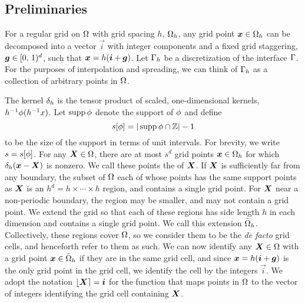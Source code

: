 \subsection{Preliminaries}

For a regular grid on $\Omega$ with grid spacing $h$, $\Omega_h$, any grid point
$\boldsymbol{x}\in\Omega_h$ can be decomposed into a vector $\vec{i}$ with integer components and a
fixed grid staggering, $\boldsymbol{g}\in[0,\,1)^d$, such that $\boldsymbol{x}=h(\boldsymbol{i}+\boldsymbol{g})$. Let
$\Gamma_h$ be a discretization of the interface $\Gamma$. For the purposes of
interpolation and spreading, we can think of $\Gamma_h$ as a collection of arbitrary
points in $\Omega$.



The kernel $\delta_h$ is the tensor product of scaled, one-dimensional kernels,
$h^{-1}\phi(h^{-1}x)$. Let $\operatorname{supp}\phi$ denote the support of $\phi$ and define
\begin{equation}
    s[\phi] = |\operatorname{supp}\phi\cap\mathbb{Z}|-1
\end{equation}
to be the size of the support in terms of unit intervals. For brevity, we write
$s=s[\phi]$. For any $\boldsymbol{X}\in\Omega$, there are at most $s^d$ grid points
$\boldsymbol{x}\in\Omega_h$ for which $\delta_h(\boldsymbol{x}-\boldsymbol{X})$ is nonzero. We call these points the
 of $\boldsymbol{X}$. If $\boldsymbol{X}$ is sufficiently far from any boundary, the subset
of $\Omega$ each of whose points has the same support points as $\boldsymbol{X}$ is an
$h^d=h\times\cdots\times h$ region, and contains a single grid point. For $\boldsymbol{X}$ near a
non-periodic boundary, the region may be smaller, and may not contain a grid point. We
extend the grid so that each of these regions has side length $h$ in each dimension and
contains a single grid point.  We call this extension $\bar{\Omega}_h$. Collectively,
these regions cover $\Omega$, so we consider them to be the \emph{de facto} grid cells,
and henceforth refer to them as such. We can now identify any $\boldsymbol{X}\in\Omega$ with a grid
point $\boldsymbol{x}\in\bar{\Omega}_h$ if they are in the same grid cell, and since
$\boldsymbol{x}=h(\boldsymbol{i}+\boldsymbol{g})$ is the only grid point in the grid cell, we identify the cell by
the integers $\vec{i}$. We adopt the notation $\left\lfloor{\boldsymbol{X}}\right\rceil=\boldsymbol{i}$ for the function that
maps points in $\Omega$ to the vector of integers identifying the grid cell containing
$\boldsymbol{X}$.

